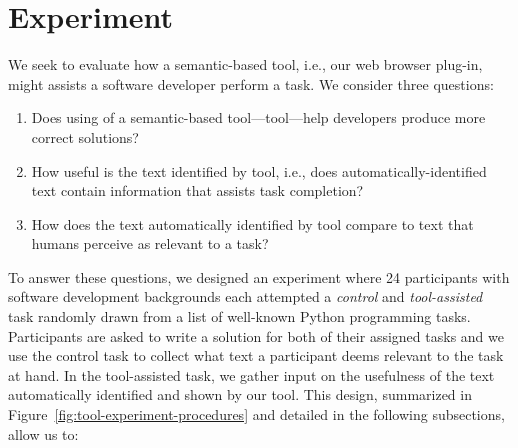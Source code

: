 




\section{Experiment}
\label{cp6:experiment}








We seek to evaluate how a semantic-based tool, i.e., our web browser plug-in, might assists a software developer perform a task.
We consider three questions:


\begin{enumerate}[label=\textit{RQ}\arabic*]
    \item Does using of a semantic-based tool---\acs{tool}---help developers produce more correct solutions? 
    \item How useful is the text identified by \acs{tool}, i.e., does  automatically-identified text contain information that assists task completion? 
    \item How does the text automatically identified by \acs{tool} compare to text 
    that humans perceive as relevant to a task?
\end{enumerate}


% 


To answer these questions, we designed an experiment where 24 participants with software development backgrounds each attempted a
\textit{control} and \textit{tool-assisted} task randomly drawn from a list of well-known Python programming tasks.
Participants are asked to write a solution for both of their assigned tasks
and we use the control task to collect what text a participant deems relevant to the task at hand.
In the tool-assisted task, we gather input on the usefulness of the text automatically identified and shown by our tool. 
This design, summarized in Figure~\ref{fig:tool-experiment-procedures} and detailed in the following subsections,  allow us to:






